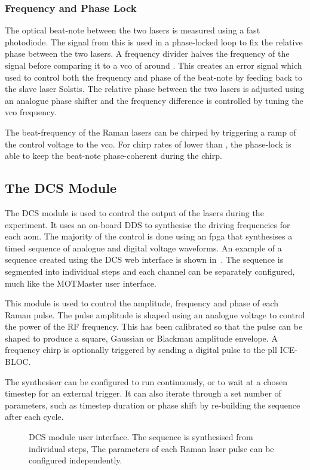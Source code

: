 \subsubsection{Frequency and Phase Lock} The optical beat-note between the two
lasers is measured using a fast photodiode. The signal from this is used in a
phase-locked loop to fix the relative phase between the two lasers. A frequency
divider halves the frequency of the signal before comparing it to a \ac{vco} of
around . This creates an error signal which used to
control both the frequency and phase of the beat-note by feeding back to the
slave laser Solstis. The relative phase between the two lasers is adjusted using
an analogue phase shifter and the frequency difference is controlled by tuning
the \ac{vco} frequency. \par\noindent The beat-frequency of the Raman lasers can
be chirped by triggering a ramp of the control voltage to the \ac{vco}. For
chirp rates of lower than , the phase-lock
is able to keep the beat-note phase-coherent during the chirp.  \subsection{The
DCS Module}\label{subsec:dcs_module} The DCS module is used to control the
output of the lasers during the experiment. It uses an on-board \ac{DDS} to
synthesise the  driving frequencies for each \ac{aom}.
The majority of the control is done using an \ac{fpga} that synthesises a timed
sequence of analogue and digital voltage waveforms. An example of a sequence
created using the DCS web interface is shown in~. The
sequence is segmented into individual steps and each channel can be separately
configured, much like the MOTMaster user interface. \par\noindent This module is
used to control the amplitude, frequency and phase of each Raman pulse. The
pulse amplitude is shaped using an analogue voltage to control the power of the
RF frequency. This has been calibrated so that the pulse can be shaped to
produce a square, Gaussian or Blackman amplitude envelope. A frequency chirp is
optionally triggered by sending a digital pulse to the \ac{pll} ICE-BLOC.
\par\noindent The synthesiser can be configured to run continuously, or to wait
at a chosen timestep for an external trigger. It can also iterate through a set
number of parameters, such as timestep duration or phase shift by re-building
the sequence after each cycle.  \begin{figure}[!htbp] \centering
	\caption[DCS Module User interface]{DCS module user interface. The sequence is
		synthesised from individual steps, The parameters of each Raman laser pulse
		can be configured independently.} \label{fig:dcs_module} \end{figure}

